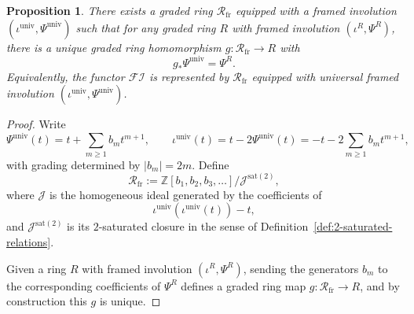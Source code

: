 \documentclass[a4paper]{amsart}
\theoremstyle{plain}
\newtheorem{proposition}[subsubsection]{Proposition}
\theoremstyle{definition}
\newcommand{\ZZ}{\mathbb{Z}}
\newcommand{\univ}{\mathrm{univ}}
\newcommand{\Rfr}{\mathcal{R}_{\mathrm{fr}}}
\renewcommand{\ge}{\geqslant}
\begin{document}
\begin{proposition}\label{prop:universal-framed-involution-ring}
	There exists a graded ring $\Rfr$ equipped with a framed involution $(\iota^{\univ}, \Psi^{\univ})$ such that for any graded ring $R$ with framed involution $(\iota^R, \Psi^R)$, there is a unique graded ring homomorphism $g:\Rfr \to R$ with
	\[
		g_*\Psi^{\univ}=\Psi^R.
	\]
	Equivalently, the functor $\mathcal{FI}$ is represented by $\Rfr$ equipped with universal framed involution $(\iota^{\univ}, \Psi^{\univ})$.
\end{proposition}
\begin{proof}
	Write
	\[
		\Psi^{\univ}(t)=t+\sum_{m\ge 1} b_m t^{m+1}, \qquad \iota^{\univ}(t) = t-2\Psi^{\univ}(t) = -t - 2\sum_{m\ge 1} b_m t^{m+1},
	\]
	with grading determined by $|b_m|=2m$. Define
	\[
		\Rfr:=\ZZ[b_1, b_2, b_3, \ldots]/\mathcal{J}^{\mathrm{sat}(2)},
	\]
	where $\mathcal{J}$ is the homogeneous ideal generated by the coefficients of
	\[
		\iota^{\univ}(\iota^{\univ}(t))-t,
	\]
	and $\mathcal{J}^{\mathrm{sat}(2)}$ is its $2$-saturated closure in the sense of Definition~\ref{def:2-saturated-relations}.

	Given a ring $R$ with framed involution $(\iota^R, \Psi^R)$, sending the generators $b_m$ to the corresponding coefficients of $\Psi^R$ defines a graded ring map $g:\Rfr \to R$, and by construction this $g$ is unique.
\end{proof}
\end{document}
